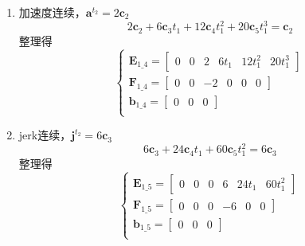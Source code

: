 \documentclass[40pt,a4paper,UTF8,twocolumn]{ctexart}%
\numberwithin{equation}{section}
\begin{document}
\begin{enumerate}
    \item 加速度连续，$\bm a^{t_2}= 2\bm c_2$
    \begin{equation}
        2\bm c_2+6 \bm c_3t_1+12 \bm c_4t_1^2+20 \bm c_5t_1^3=\bm c_2
    \end{equation}
    整理得
    \begin{equation}
        \left\{
            \begin{array}{l}
                \bm E_{1\_4}=
                \begin{bmatrix}
                    0&0&2&6t_1&12t_1^2&20t_1^3
                \end{bmatrix}\\
                \bm F_{1\_4}=
                \begin{bmatrix}
                    0&0&-2&0&0&0
                \end{bmatrix}\\
                \bm b_{1\_4} = 
                \begin{bmatrix}
                    0 & 0 & 0
                \end{bmatrix}\\
            \end{array}
        \right.
        \label{eq1.6} %
    \end{equation}

    \item jerk连续，$\bm j^{t_2}= 6\bm c_3$
    \begin{equation}
        6\bm c_3+24\bm c_4t_1+60\bm c_5t_1^2 = 6\bm c_3
    \end{equation}
    整理得
    \begin{equation}
        \left\{
            \begin{array}{l}
                \bm E_{1\_5}=
                \begin{bmatrix}
                    0&0&0&6&24t_1&60t_1^2
                \end{bmatrix}\\
                \bm F_{1\_5}=
                \begin{bmatrix}
                    0&0&0&-6&0&0
                \end{bmatrix}\\
                \bm b_{1\_5} = 
                \begin{bmatrix}
                    0 & 0 & 0
                \end{bmatrix}\\
            \end{array}
        \right.
        \label{eq1.6} %
    \end{equation}


\end{enumerate}
\end{document}
